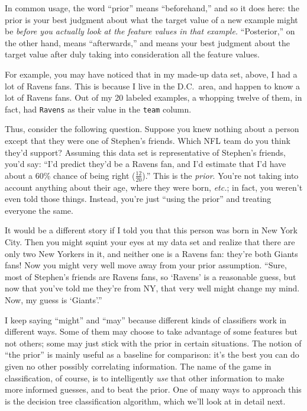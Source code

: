 In common usage, the word ``prior'' means ``beforehand,'' and so it does here:
the prior is your best judgment about what the target value of a new example
might be \textit{before you actually look at the feature values in that
example.} ``Posterior,'' on the other hand, means ``afterwards,'' and means
your best judgment about the target value after duly taking into consideration
all the feature values.

For example, you may have noticed that in my made-up data set, above, I had a
lot of Ravens fans. This is because I live in the D.C.~area, and happen to know
a lot of Ravens fans. Out of my 20 labeled examples, a whopping twelve of them,
in fact, had \texttt{Ravens} as their value in the \texttt{team} column.

Thus, consider the following question. Suppose you knew nothing about a person
except that they were one of Stephen's friends. Which NFL team do you think
they'd support? Assuming this data set is representative of Stephen's friends,
you'd say: ``I'd predict they'd be a Ravens fan, and I'd estimate that I'd
have about a 60\% chance of being right ($\frac{12}{20}$).'' This is the
\textit{prior}. You're not taking into account anything about their age, where
they were born, \textit{etc.}; in fact, you weren't even told those things.
Instead, you're just ``using the prior'' and treating everyone the same.

It would be a different story if I told you that this person was born in New
York City. Then you might squint your eyes at my data set and realize that
there are only two New Yorkers in it, and neither one is a Ravens fan:
they're both Giants fans! Now you might very well move away from your prior
assumption. ``Sure, most of Stephen's friends are Ravens fans, so `Ravens'
is a reasonable guess, but now that you've told me they're from NY, that very
well might change my mind. Now, my guess is `Giants'.''

I keep saying ``might'' and ``may'' because different kinds of classifiers work
in different ways. Some of them may choose to take advantage of some features
but not others; some may just stick with the prior in certain situations. The
notion of ``the prior'' is mainly useful as a baseline for comparison: it's the
best you can do given no other possibly correlating information. The name of
the game in classification, of course, is to intelligently \textit{use} that
other information to make more informed guesses, and to beat the prior. One of
many ways to approach this is the decision tree classification algorithm, which
we'll look at in detail next.

